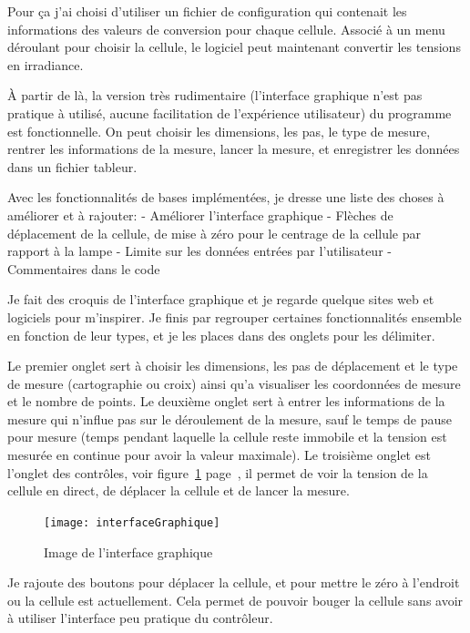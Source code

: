 \documentclass[a4paper, 12pt]{article}
\begin{document}
Pour ça j'ai choisi d'utiliser un fichier de configuration qui contenait les informations des valeurs de conversion pour chaque cellule. Associé à un menu déroulant pour choisir la cellule, le logiciel peut maintenant convertir les tensions en irradiance.  

À partir de là, la version très rudimentaire (l'interface graphique n'est pas pratique à utilisé, aucune facilitation de l'expérience utilisateur) du programme est fonctionnelle.
On peut choisir les dimensions, les pas, le type de mesure, rentrer les informations de la mesure, lancer la mesure, et enregistrer les données dans un fichier tableur.

Avec les fonctionnalités de bases implémentées, je dresse une liste des choses à améliorer et à rajouter:
- Améliorer l'interface graphique
- Flèches de déplacement de la cellule, de mise à zéro pour le centrage de la cellule par rapport à la lampe
- Limite sur les données entrées par l'utilisateur
- Commentaires dans le code

Je fait des croquis de l'interface graphique et je regarde quelque sites web et logiciels pour m'inspirer.
Je finis par regrouper certaines fonctionnalités ensemble en fonction de leur types, et je les places dans des onglets pour les délimiter.

Le premier onglet sert à choisir les dimensions, les pas de déplacement et le type de mesure (cartographie ou croix) ainsi qu'a visualiser les coordonnées de mesure et le nombre de points.
Le deuxième onglet sert à entrer les informations de la mesure qui n'influe pas sur le déroulement de la mesure, sauf le temps de pause pour mesure (temps pendant laquelle la cellule reste immobile et la tension est mesurée en continue pour avoir la valeur maximale).
Le troisième onglet est l'onglet des contrôles, voir figure~\ref{fig:interfaceGraphique} page~\pageref{fig:interfaceGraphique}, il permet de voir la tension de la cellule en direct, de déplacer la cellule et de lancer la mesure.

\begin{figure}[h]
	\centering
	\texttt{[image: interfaceGraphique]}
	\caption{Image de l'interface graphique}
	\label{fig:interfaceGraphique}
\end{figure}

Je rajoute des boutons pour déplacer la cellule, et pour mettre le zéro à l'endroit ou la cellule est actuellement.
Cela permet de pouvoir bouger la cellule sans avoir à utiliser l'interface peu pratique du contrôleur.
\end{document}
